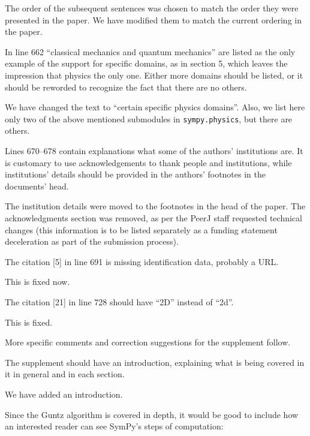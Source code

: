 \documentclass[answers,12pt]{exam}
\begin{document}
\begin{questions}
\begin{solution}
The order of the subsequent sentences was chosen to match the order they were
presented in the paper. We have modified them to match the current ordering in
the paper.
\end{solution}

\question In line 662 ``classical mechanics and quantum mechanics'' are listed as the only example of the support for specific domains, as in section 5, which leaves the impression that physics the only one. Either more domains should be listed, or it should be reworded to recognize the fact that there are no others.
\begin{solution}
  We have changed the text to ``certain specific physics domains''. Also, we
  list here only two of the above mentioned submodules in
  \texttt{sympy.physics}, but there are others.
\end{solution}

\question Lines 670--678 contain explanations what some of the authors' institutions are. It is customary to use acknowledgements to thank people and institutions, while institutions' details should be provided in the authors' footnotes in the documents' head.
\begin{solution}
  The institution details were moved to the footnotes in the head of the
  paper. The acknowledgments section was removed, as per the PeerJ staff
  requested technical changes (this information is to be listed separately as
  a funding statement deceleration as part of the submission process).
\end{solution}

\question The citation [5] in line 691 is missing identification data, probably a URL\@.
\begin{solution}
This is fixed now.
\end{solution}

\question The citation [21] in line 728 should have ``2D'' instead of ``2d''.
\begin{solution}
This is fixed.
\end{solution}

More specific comments and correction suggestions for the supplement follow.

\question The supplement should have an introduction, explaining what is being covered in it in general and in each section.
\begin{solution}
We have added an introduction.
\end{solution}

\question Since the Guntz algorithm is covered in depth, it would be good to
include how an interested reader can see SymPy's steps of computation:


\end{questions}
\end{document}
